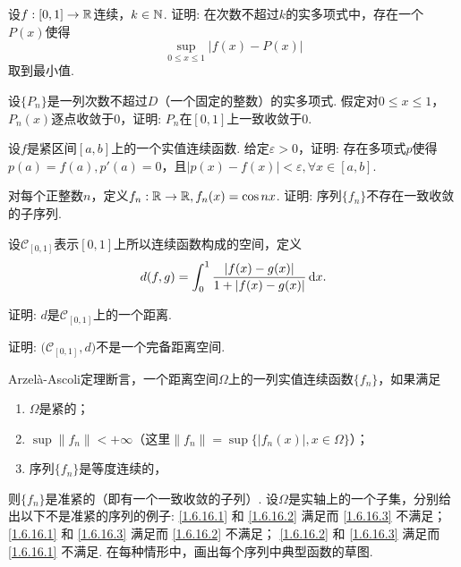 \begin{example}
  设$f:[0,1]\to\mathbb R$连续，$k\in\mathbb N$. 证明: 在次数不超过$k$的实多项式中，存在一个$P(x)$使得
  \[ \sup_{0\le x\le1}|f(x)-P(x)| \]
  取到最小值.
\end{example}

\begin{example}
  设$\{P_n\}$是一列次数不超过$D$（一个固定的整数）的实多项式. 假定对$0\le x\le 1$，$P_n(x)$逐点收敛于$0$，证明: $P_n$在$[0,1]$上一致收敛于0.
\end{example}

\begin{example}
  设$f$是紧区间$[a,b]$上的一个实值连续函数. 给定$\varepsilon>0$，证明: 存在多项式$p$使得$p(a)=f(a),p'(a)=0$，且$|p(x)-f(x)|<\varepsilon,\forall x\in[a,b]$.
\end{example}

\begin{example}
  对每个正整数$n$，定义$f_n:\mathbb R\to\mathbb R,f_n(x)=\cos nx$. 证明: 序列$\{f_n\}$不存在一致收敛的子序列.
\end{example}

\begin{example}
  设$\mathcal C_{[0,1]}$表示$[0,1]$上所以连续函数构成的空间，定义
  \[ d(f,g)=\int_0^1\frac{|f(x)-g(x)|}{1+|f(x)-g(x)|}\,\mathrm dx. \]
  \begin{eenum}
    \item 证明: $d$是$\mathcal C_{[0,1]}$上的一个距离.
    \item 证明: $\big(\mathcal C_{[0,1]},d\big)$不是一个完备距离空间.
  \end{eenum}
\end{example}

\begin{example}
  Arzel\`a-Ascoli定理断言，一个距离空间$\Omega$上的一列实值连续函数$\{f_n\}$，如果满足
  \begin{enumerate}[label=(\arabic*),left=0.5cm]
    \item\label{1.6.16.1} $\Omega$是紧的；
    \item\label{1.6.16.2} $\sup\|f_n\|<+\infty$（这里$\|f_n\|=\sup\{|f_n(x)|,x\in\Omega\}$）；
    \item\label{1.6.16.3} 序列$\{f_n\}$是等度连续的，
  \end{enumerate}
  则$\{f_n\}$是准紧的（即有一个一致收敛的子列）. 设$\Omega$是实轴上的一个子集，分别给出以下不是准紧的序列的例子: \ref{1.6.16.1} 和 \ref{1.6.16.2} 满足而 \ref{1.6.16.3} 不满足； \ref{1.6.16.1} 和 \ref{1.6.16.3} 满足而 \ref{1.6.16.2} 不满足；  \ref{1.6.16.2} 和 \ref{1.6.16.3} 满足而 \ref{1.6.16.1} 不满足. 在每种情形中，画出每个序列中典型函数的草图.
\end{example}

